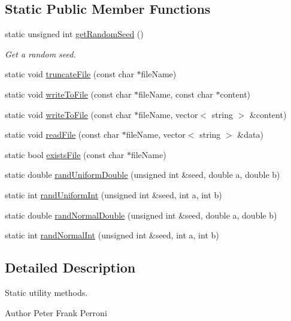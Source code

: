 \subsection*{Static Public Member Functions}
\begin{DoxyCompactItemize}
\item 
static unsigned int \hyperlink{classTHUtil_ac88c9d3a82da43e5afc2cb063d2579ec}{get\+Random\+Seed} ()
\begin{DoxyCompactList}\small\item\em Get a random seed. \end{DoxyCompactList}\item 
static void \hyperlink{classTHUtil_a819e347db961b91164ba17bcd4e95679}{truncate\+File} (const char $\ast$file\+Name)
\item 
static void \hyperlink{classTHUtil_ae3e86de83ed0d32c8057b90ee32c0a1f}{write\+To\+File} (const char $\ast$file\+Name, const char $\ast$content)
\item 
static void \hyperlink{classTHUtil_a8ef13a02c176f8b3950f2acd4239c49c}{write\+To\+File} (const char $\ast$file\+Name, vector$<$ string $>$ \&content)
\item 
static void \hyperlink{classTHUtil_a37104e857dc60914617e0bc79cb08737}{read\+File} (const char $\ast$file\+Name, vector$<$ string $>$ \&data)
\item 
static bool \hyperlink{classTHUtil_a576da7df177362b2c10e6d0704974c85}{exists\+File} (const char $\ast$file\+Name)
\item 
static double \hyperlink{classTHUtil_ad95b7150adaf4d576de406c8e7b8142c}{rand\+Uniform\+Double} (unsigned int \&seed, double a, double b)
\item 
static int \hyperlink{classTHUtil_a5318218946e65adbdb431a2664d04016}{rand\+Uniform\+Int} (unsigned int \&seed, int a, int b)
\item 
static double \hyperlink{classTHUtil_a1961a690dfec7f0dab0be849d31828ea}{rand\+Normal\+Double} (unsigned int \&seed, double a, double b)
\item 
static int \hyperlink{classTHUtil_a3b5857a6e815f895ffab6a769ed484c8}{rand\+Normal\+Int} (unsigned int \&seed, int a, int b)
\end{DoxyCompactItemize}


\subsection{Detailed Description}
Static utility methods. 

\begin{DoxyAuthor}{Author}
Peter Frank Perroni 
\end{DoxyAuthor}


